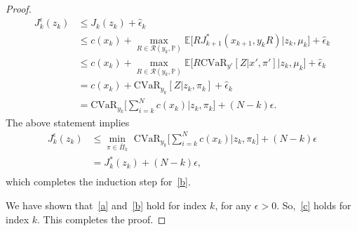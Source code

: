 \documentclass[letterpaper, 10 pt, conference]{ieeeconf}  %
\begin{document}
\begin{proof}
%
\begin{equation*}\begin{aligned}
J_k^\epsilon(z_k) & \leq J_k(z_k) + \hat{\epsilon}_k \\
& \leq c(x_k) + {\underset{R \in \mathcal{R}(y_k, \mathbb{P})}\max} \mathbb{E}\big[ RJ_{k+1}^*(x_{k+1},y_kR) \big| z_k, \mu_k \big] + \hat{\epsilon}_k\\
& \leq c(x_k) + {\underset{R \in \mathcal{R}(y_k, \mathbb{P})}\max} \mathbb{E}\big[ R\text{CVaR}_{y'} [Z|x', \pi' ] \big| z_k, \mu_k \big] + \hat{\epsilon}_k\\
& = c(x_k) + \text{CVaR}_{y_k}[Z|z_k, \pi_k] + \hat{\epsilon}_k\\
& = \text{CVaR}_{y_k}\big[\textstyle \sum_{i=k}^N c(x_k)|z_k, \pi_k\big] + (N-k)\epsilon.
\end{aligned}\end{equation*}
%
The above statement implies
%
\begin{equation*}\begin{aligned}
J_k^\epsilon(z_k) & \leq {\underset{\pi \in \bar{\Pi}_k} \min} \text{ CVaR}_{y_k}\big[\textstyle \sum_{i=k}^N c(x_k)|z_k, \pi_k\big] + (N-k)\epsilon \\
& = J_k^*(z_k) + (N-k)\epsilon, \\
\end{aligned}\end{equation*}
%
which completes the induction step for~\eqref{b}. 

We have shown that~\eqref{a} and~\eqref{b} hold for index $k$, for any $\epsilon>0$. So,~\eqref{c} holds for index $k$. 
This completes the proof.
\end{proof}
\addtolength{\textheight}{-2cm}   %


\end{document}
